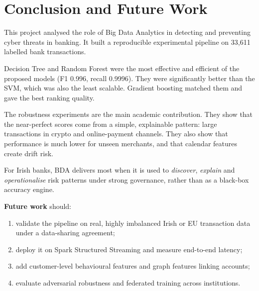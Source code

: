 \documentclass[12pt,a4paper]{article}
\begin{document}
\section{Conclusion and Future Work}\label{sec:concl}
This project analysed the role of Big Data Analytics in detecting and preventing cyber threats in banking. It built a reproducible experimental pipeline on 33{,}611 labelled bank transactions.

Decision Tree and Random Forest were the most effective and efficient of the proposed models (F1 0.996, recall 0.9996). They were significantly better than the SVM, which was also the least scalable. Gradient boosting matched them and gave the best ranking quality.

The robustness experiments are the main academic contribution. They show that the near-perfect scores come from a simple, explainable pattern: large transactions in crypto and online-payment channels. They also show that performance is much lower for unseen merchants, and that calendar features create drift risk.

For Irish banks, BDA delivers most when it is used to \emph{discover}, \emph{explain} and \emph{operationalise} risk patterns under strong governance, rather than as a black-box accuracy engine.

\textbf{Future work} should:
\begin{enumerate}[label=(\roman*),nosep]
\item validate the pipeline on real, highly imbalanced Irish or EU transaction data under a data-sharing agreement;
\item deploy it on Spark Structured Streaming and measure end-to-end latency;
\item add customer-level behavioural features and graph features linking accounts;
\item evaluate adversarial robustness and federated training across institutions.
\end{enumerate}

\newpage



\newpage
\appendix
\end{document}
